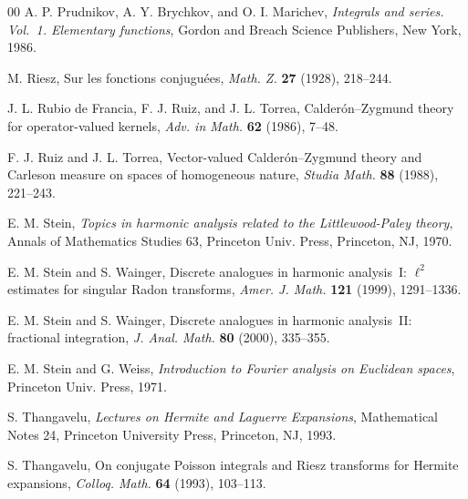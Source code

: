 \documentclass[11pt]{amsart}
\numberwithin{equation}{section}
\theoremstyle{plain}
\theoremstyle{remark}
\begin{document}
\begin{thebibliography}{00}
A. P. Prudnikov, A. Y. Brychkov, and O. I. Marichev,
\textit{Integrals and series. Vol.~1. Elementary functions},
Gordon and Breach Science Publishers, New York, 1986.


M. Riesz,
Sur les fonctions conjugu\'ees,
\textit{Math. Z.} \textbf{27} (1928), 218--244.

J. L. Rubio de Francia, F. J. Ruiz, and J. L. Torrea,
Calder\'on--Zygmund theory for operator-valued kernels,
\textit{Adv. in Math.} \textbf{62} (1986), 7--48.

F. J. Ruiz and J. L. Torrea,
Vector-valued Calder\'on--Zygmund theory and Carleson measure on spaces of homogeneous nature,
\textit{Studia Math.} \textbf{88} (1988), 221--243.

E. M. Stein,
\textit{Topics in harmonic analysis related to the Littlewood-Paley theory},
Annals of Mathematics Studies 63, Princeton Univ. Press, Princeton, NJ, 1970.


E. M. Stein and S. Wainger,
Discrete analogues in harmonic analysis~I: $\ell^2$ estimates for singular Radon transforms,
\textit{Amer. J. Math.} \textbf{121} (1999), 1291--1336.

E. M. Stein and S. Wainger,
Discrete analogues in harmonic analysis~II: fractional integration,
\textit{J. Anal. Math.} \textbf{80} (2000), 335--355.


E. M. Stein and G. Weiss,
\textit{Introduction to Fourier analysis on Euclidean spaces},
Princeton Univ. Press, 1971.

S. Thangavelu,
\textit{Lectures on Hermite and Laguerre Expansions},
Mathematical Notes 24, Princeton University Press, Princeton, NJ, 1993.

S. Thangavelu,
On conjugate Poisson integrals and Riesz transforms for Hermite expansions,
\textit{Colloq. Math.} \textbf{64} (1993), 103--113.


\end{thebibliography}

\end{document}
